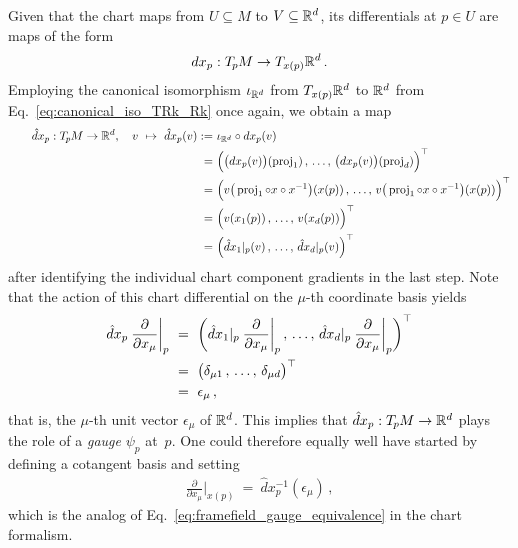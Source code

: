 Given that the chart maps from $U \subseteq M$ to $V \subseteq \mathbb{R}^d$, its differentials at $p\in U$ are maps of the form
\begin{align}
    dx_p: T_{\mkern-1.5mu p}\mkern-.5muM \to T_{x(p)}\mathbb{R}^d \,.
\end{align}
Employing the canonical isomorphism $\iota_{\mathbb{R}^d}$ from $T_{x(p)}\mathbb{R}^d$ to $\mathbb{R}^d$ from Eq.~\eqref{eq:canonical_iso_TRk_Rk} once again, we obtain a map
\begin{align}\label{eq:chart_differential_via_gradients}
    \qquad
    \hat{d}x_p: T_{\mkern-1.5mu p}\mkern-.5muM \to \mathbb{R}^d,\ \ \ v\ \mapsto\ \hat{d}x_p (v)
    :=\ &\iota_{\mathbb{R}^d} \circ dx_p (v) \notag \\
     =\ & \Big( \big(dx_p(v) \big)(\operatorname{proj}_1) \,,\,\dots,\, \big(dx_p(v) \big)(\operatorname{proj}_d) \Big)^\top \notag \\
     =\ & \Big( v\big(\operatorname{proj}_1 \circ x \circ x^{-1}\big)(x(p)) \,,\,\dots,\, v\big(\operatorname{proj}_1 \circ x \circ x^{-1}\big)(x(p)) \Big)^\top \notag \\
     =\ & \Big( v(x_1(p)) \,,\,\dots,\, v(x_d(p)) \Big)^\top \notag \\
     =\ & \Big( \hat{d}x_1 |_p(v) \,,\,\dots,\, \hat{d}x_d |_p(v) \Big)^\top
\end{align}
after identifying the individual chart component gradients in the last step.
Note that the action of this chart differential on the $\mu$-th coordinate basis yields
\begin{align}
    \hat{d}x_p \: \frac{\partial}{\partial x_\mu} \bigg|_p
     \ &=\ \bigg( \hat{d}x_1|_p \: \frac{\partial}{\partial x_\mu} \bigg|_p \,,\,\dots,\, \hat{d}x_d|_p \: \frac{\partial}{\partial x_\mu} \bigg|_p \bigg)^\top \notag \\
     \ &=\ \big( \delta_{\mu1} \,,\,\dots,\, \delta_{\mu d} \big)^\top \notag \\
     \ &=\ \epsilon_\mu \,,
\end{align}
that is, the $\mu$-th unit vector $\epsilon_\mu$ of $\mathbb{R}^d$.
This implies that $\hat{d}x_p: T_{\mkern-1.5mu p}\mkern-.5muM \to \mathbb{R}^d$ plays the role of a \emph{gauge} $\psi_p$ at~$p$.
One could therefore equally well have started by defining a cotangent basis and setting
\begin{align}\label{eq:coord_basis_vector_via_chart_differential}
    \frac{\partial}{\partial x_\mu} \bigg|_{x(p)}\ =\ \hat{d}x_p^{-1} (\epsilon_\mu) \,,
\end{align}
which is the analog of Eq.~\eqref{eq:framefield_gauge_equivalence} in the chart formalism.











